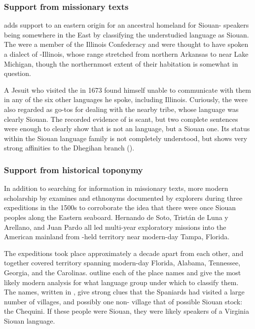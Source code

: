 \documentclass[output=paper]{LSP/langsci}
\begin{document}
\subsubsection{Support from missionary texts} \citet{Koontz1995a,Koontz1995b} adds support to an eastern origin for an ancestral homeland for Siouan- speakers being somewhere in the East by classifying the understudied  language  as Siouan. The  were a member of the Illinois Confederacy and were thought to have spoken a dialect of -Illinois, whose range stretched from northern Arkansas to near Lake Michigan, though the northernmost extent of their habitation is somewhat in question. 

A Jesuit who visited the  in 1673 found himself unable to communicate with them in any of the six other languages he spoke, including Illinois. Curiously, the  were also regarded as go-tos for dealing with the nearby  tribe, whose language was clearly Siouan. The recorded evidence of  is scant, but two complete sentences were enough to clearly show that  is not an  language, but a Siouan one. Its status within the Siouan language family is not completely understood, but  shows very strong affinities to the Dhegihan branch (\citealt{Koontz1995a,Koontz1995b}).

\subsubsection{Support from historical toponymy} In addition to searching for information in missionary texts, more modern scholarship by \citet{BookerEtAl1992} examines  and ethnonyms documented by  explorers during three expeditions in the 1500s to corroborate the idea that there were once Siouan peoples along the Eastern seaboard. Hernando de Soto, Trist\'an de Luna y Arellano, and Juan Pardo all led multi-year exploratory missions into the American mainland from -held territory near modern-day Tampa, Florida. 

The expeditions took place approximately a decade apart from each other, and together covered territory spanning modern-day Florida, Alabama, Tennessee, Georgia, and the Carolinas. \citet{BookerEtAl1992} outline each of the place names and give the most likely modern analysis for what language group under which to classify them. The names, written in  , give strong clues that the Spaniards had visited a large number of  villages, and possibly one non- village that of possible Siouan stock: the Chequini. If these people were Siouan, they were likely speakers of a Virginia Siouan language.
\end{document}
